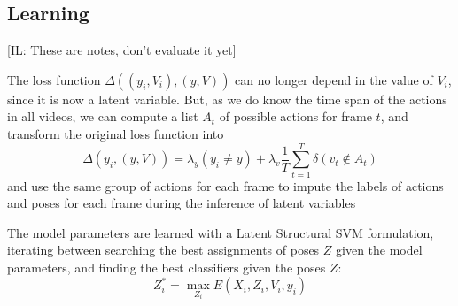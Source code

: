 \subsection{Learning} \label{subsec:learning}

[IL: These are notes, don't evaluate it yet]

The loss function $\Delta((y_i,V_i),(y,V))$ can no longer depend in the value of $V_i$, since it is now a latent variable. But, as we do know the time span of the actions in all videos, we can compute a list $A_t$ of possible actions for frame $t$, and transform the original loss function into
\begin{equation}
\Delta(y_i,(y,V)) = \lambda_y(y_i \ne y) + \lambda_v\frac{1}{T}\sum_{t=1}^T \delta(v_t \notin A_t)
\end{equation}
and use the same group of actions for each frame to impute the labels of actions and poses for each frame during the inference of latent variables

The model parameters are learned with a Latent Structural SVM formulation, iterating between searching the best assignments of poses $Z$ given the model parameters, and finding the best classifiers given the poses $Z$:
\begin{equation}
 Z_i^* = \max_{Z_i} E(X_i, Z_i, V_i, y_i)
\end{equation} 